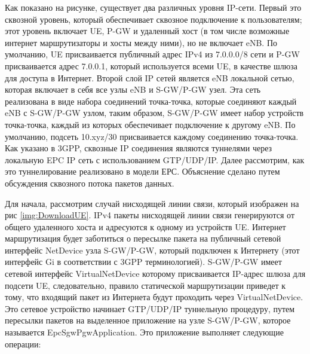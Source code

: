 Как показано на рисунке, существует два различных уровня IP-сети. 
Первый это сквозной уровень, который обеспечивает сквозное подключение к пользователям; этот уровень включает UE, P-GW и удаленный хост (в том числе возможные интернет маршрутизаторы и хосты между ними), но не включает eNB.
По умолчанию, UE присваивается публичный адрес IPv4 из 7.0.0.0/8 сети и P-GW присваивается адрес 7.0.0.1, который используется всеми UE, в качестве шлюза для доступа в Интернет.
Второй слой IP сетей является eNB локальной сетью, которая включает в себя все узлы eNB и S-GW/P-GW узел. 
Эта сеть реализована в виде набора соединений точка-точка, которые соединяют каждый eNB с S-GW/P-GW узлом, таким образом, S-GW/P-GW имеет набор устройств точка-точка, каждый из которых обеспечивает подключение к другому eNB. 
По умолчанию, подсеть 10.xyz/30 присваивается каждому соединению точка-точка.
Как указано в 3GPP, сквозные IP соединения являются туннелями через локальную EPC IP сеть с использованием GTP/UDP/IP. 
Далее рассмотрим, как это туннелирование реализовано в модели ЕРС. Объяснение сделано путем обсуждения сквозного потока пакетов данных.

Для начала, рассмотрим случай нисходящей линии связи, который изображен на рис \ref{img:DownloadUE}. 
IPv4 пакеты нисходящей линии связи генерируются от общего удаленного хоста и адресуются к одному из устройств UE. 
Интернет маршрутизация будет заботиться о пересылке пакета на публичный сетевой интерфейс NetDevice узла S-GW/P-GW, который подключен к Интернету (этот интерфейс Gi в соответствии с 3GPP терминологией). 
S-GW/P-GW имеет сетевой интерфейс VirtualNetDevice которому присваивается IP-адрес шлюза для подсети UE, следовательно, правило статической маршрутизации приведет к тому, 
что входящий пакет из Интернета будут проходить через VirtualNetDevice. 
Это сетевое устройство начинает GTP/UDP/IP туннельную процедуру, путем пересылки пакетов на выделенное приложение на узле S-GW/P-GW, которое называется EpcSgwPgwApplication. Это приложение выполняет следующие операции:



